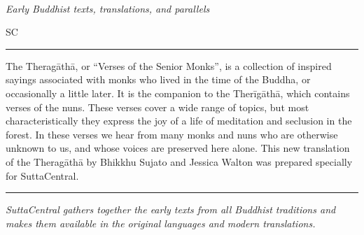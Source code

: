 \documentclass{article}
\makeatletter
\renewenvironment{quote}
               {\list{}{\listparindent=0pt%
                        \itemindent    \listparindent
                        \leftmargin=1.25in%
                        \rightmargin=1in%
                        \topsep=0pt%
                        \parsep        \z@ \@plus\p@}%
                \item\relax}
               {\endlist}
\makeatother
\begin{document}
\fboxsep=0pt%
\colorbox{pastel-yellow}{\parbox[c][1.245in][c]{1\textwidth}{%
\begin{minipage}[c][1.245in]{3.25in}\hspace{0.1em}
\end{minipage}\begin{minipage}[c][1.245in]{6.375in}
\vspace{0.47in}\begin{quote}\textcolor{cool-blue}{}\\
\textcolor{dark-medium-gray}{\itshape\footnotesize Early Buddhist texts, translations, and parallels}\end{quote}\hspace{0.1em}
\end{minipage}\begin{minipage}[c][1.245in]{0.658in}\vspace{0.25in}
\centering \textcolor{cool-blue}{SC}
\end{minipage}\begin{minipage}[c][1.245in]{6.375in}
\hspace{0.1em}
\end{minipage}\begin{minipage}[c][1.245in]{3.25in}\hspace{0.1em}
\end{minipage}
\endtabular}}%
\textcolor{dark-saturated-red}{\hrule height 0.05in}
\begin{minipage}[l][7in]{3.25in}\hspace{0.1em}
\end{minipage}\begin{minipage}[c][7in]{6.375in}

\vfill
\begin{quote}
The Theragāthā, or “Verses of the Senior Monks”, is a collection of inspired sayings associated with monks who lived in the time of the Buddha, or occasionally a little later. It is the companion to the Therīgāthā, which contains verses of the nuns. These verses cover a wide range of topics, but most characteristically they express the joy of a life of meditation and seclusion in the forest. In these verses we hear from many monks and nuns who are otherwise unknown to us, and whose voices are preserved here alone. This new translation of the Theragāthā by Bhikkhu Sujato and Jessica Walton was prepared specially for SuttaCentral.
\end{quote}
\vfill

\noindent\hfil\rule{0.3333333\textwidth}{.4pt}\hfil



\begin{center}
\vfill
\begin{quote}
\textit{SuttaCentral gathers together the early texts from all Buddhist traditions and makes them available in the original languages and modern translations.}
\end{quote}
\vfill
\end{center}


\end{minipage}
\end{document}

